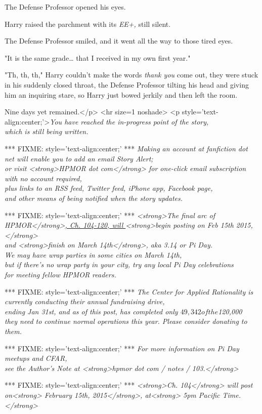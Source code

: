 The Defense Professor opened his eyes.

Harry raised the parchment with its \emph{EE+,} still silent.

The Defense Professor smiled, and it went all the way to those tired eyes.

"It is the same grade{\ldots} that I received in my own first year."

"Th, th, th," Harry couldn't make the words \emph{thank you} come out, they were stuck in his suddenly closed throat, the Defense Professor tilting his head and giving him an inquiring stare, so Harry just bowed jerkily and then left the room.

Nine days yet remained.</p>
<hr size=1 noshade>
<p style='text-align:center;'>\emph{You have reached the in-progress point of the story,\\
which is still being written.}

*** FIXME: style='text-align:center;' ***
\emph{Making an account at fanfiction dot net will enable you to add an email Story Alert;}\\
\emph{or visit <strong>HPMOR dot com</strong> for one-click email subscription with no account required,}\\
\emph{plus links to an RSS feed, Twitter feed, iPhone app, Facebook page,}\\
\emph{and other means of being notified when the story updates.}

*** FIXME: style='text-align:center;' ***
\emph{<strong>The final arc of HPMOR</strong>\underline{, Ch. 104-120, will }<strong>begin posting on Feb 15th 2015,</strong>}\\
\emph{and <strong>finish on March 14th</strong>, aka 3.14 or Pi Day.}\\
\emph{We may have wrap parties in some cities on March 14th,}\\
\emph{but if there's no wrap party in your city, try any local Pi Day celebrations}\\
\emph{for meeting fellow HPMOR readers.}

*** FIXME: style='text-align:center;' ***
\emph{The Center for Applied Rationality is currently conducting their annual fundraising drive,\\
ending Jan 31st, and as of this post, has completed only $49,342 of the $120,000\\
they need to continue normal operations this year. Please consider donating to them.}

*** FIXME: style='text-align:center;' ***
\emph{For more information on Pi Day meetups and CFAR,}\\
\emph{see the Author's Note at <strong>hpmor dot com / notes / 103.</strong>}

*** FIXME: style='text-align:center;' ***
\emph{<strong>Ch. 104</strong> will post on<strong> February 15th, 2015</strong>, at<strong> 5pm Pacific Time.</strong>}